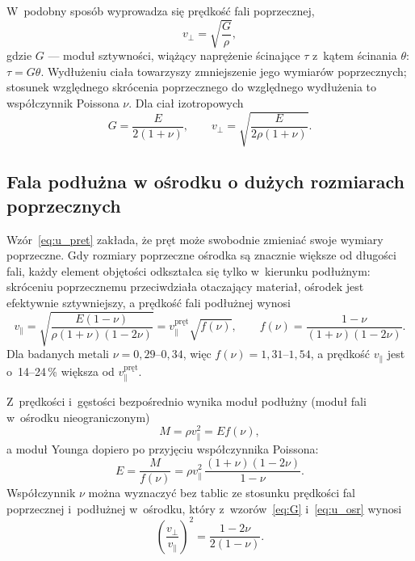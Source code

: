 \documentclass[12pt, a4paper]{article}
\begin{document}
W~podobny sposób wyprowadza się prędkość fali poprzecznej,
\begin{equation}
    v_\perp = \sqrt{\frac{G}{\rho}},
    \label{eq:u_poprz}
\end{equation}
gdzie $G$ --- moduł sztywności, wiążący naprężenie ścinające $\tau$ z~kątem ścinania
$\theta$: $\tau = G\theta$. Wydłużeniu ciała towarzyszy zmniejszenie jego wymiarów
poprzecznych; stosunek względnego skrócenia poprzecznego do względnego wydłużenia to
współczynnik Poissona $\nu$. Dla ciał izotropowych~\cite{skrypt}
\begin{equation}
    G = \frac{E}{2(1 + \nu)}, \qquad
    v_\perp = \sqrt{\frac{E}{2\rho(1 + \nu)}}.
    \label{eq:G}
\end{equation}

\subsection{Fala podłużna w ośrodku o dużych rozmiarach poprzecznych}

Wzór~\eqref{eq:u_pret} zakłada, że pręt może swobodnie zmieniać swoje wymiary poprzeczne.
Gdy rozmiary poprzeczne ośrodka są znacznie większe od długości fali, każdy element objętości
odkształca się tylko w~kierunku podłużnym: skróceniu poprzecznemu przeciwdziała otaczający
materiał, ośrodek jest efektywnie sztywniejszy, a prędkość fali podłużnej wynosi~\cite{skrypt}
\begin{equation}
    v_\parallel = \sqrt{\frac{E(1 - \nu)}{\rho(1 + \nu)(1 - 2\nu)}}
    = v_\parallel^\text{pręt}\sqrt{f(\nu)}, \qquad
    f(\nu) = \frac{1 - \nu}{(1 + \nu)(1 - 2\nu)}.
    \label{eq:u_osr}
\end{equation}
Dla badanych metali $\nu = 0{,}29$--$0{,}34$, więc $f(\nu) = 1{,}31$--$1{,}54$, a prędkość
$v_\parallel$ jest o~14--24\,\% większa od $v_\parallel^\text{pręt}$.

Z~prędkości i~gęstości bezpośrednio wynika moduł podłużny (moduł fali w~ośrodku nieograniczonym)
\begin{equation}
    M = \rho v_\parallel^2 = E f(\nu),
    \label{eq:M}
\end{equation}
a moduł Younga dopiero po przyjęciu współczynnika Poissona:
\begin{equation}
    E = \frac{M}{f(\nu)} = \rho v_\parallel^2\,\frac{(1 + \nu)(1 - 2\nu)}{1 - \nu}.
    \label{eq:E}
\end{equation}
Współczynnik $\nu$ można wyznaczyć bez tablic ze stosunku prędkości fal poprzecznej
i~podłużnej w~ośrodku, który z~wzorów~\eqref{eq:G} i~\eqref{eq:u_osr} wynosi
\begin{equation}
    \left(\frac{v_\perp}{v_\parallel}\right)^2 = \frac{1 - 2\nu}{2(1 - \nu)}.
    \label{eq:nu}
\end{equation}
\end{document}
